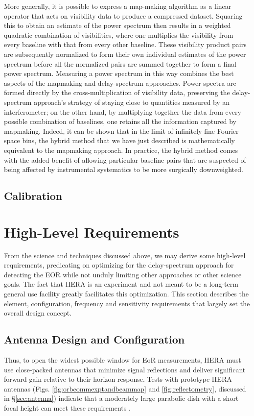 \documentclass[preprint,11pt]{aastex}
\begin{document}
More generally, it is possible to express a map-making algorithm as a linear operator that acts on visibility data to produce a compressed dataset. Squaring this to obtain an estimate of the power spectrum then results in a weighted quadratic combination of visibilities, where one multiplies the visibility from every baseline with that from every other baseline. These visibility product pairs are subsequently normalized to form their own individual estimates of the power spectrum before all the normalized pairs are summed together to form a final power spectrum. Measuring a power spectrum in this way combines the best aspects of the mapmaking and delay-spectrum approaches. Power spectra are formed directly by the cross-multiplication of visibility data, preserving the delay-spectrum approach's strategy of staying close to quantities measured by an interferometer; on the other hand, by multiplying together the data from every possible combination of baselines, one retains all the information captured by mapmaking. Indeed, it can be shown \citep{liu_et_al2014a} that in the limit of infinitely fine Fourier space bins, the hybrid method that we have just described is mathematically equivalent to the mapmaking approach. In practice, the hybrid method comes with the added benefit of allowing particular baseline pairs that are suspected of being affected by instrumental systematics to be more surgically downweighted.

\subsection{Calibration}
\label{sec:calibration}



\section{High-Level Requirements} 
\label{sec:requirements}
From the science and techniques discussed above, we may derive some high-level requirements, predicating on optimizing for the delay-spectrum approach for detecting the EOR while not unduly limiting other approaches or other science goals.  The fact that HERA is an experiment and not meant to be a long-term general use facility greatly facilitates this optimization. This section describes the element, configuration, frequency and sensitivity requirements that largely set the overall design concept.

\subsection{Antenna Design and Configuration}
Thus, to open the widest possible window for EoR measurements, HERA must use close-packed antennas that
minimize signal reflections and deliver significant forward gain relative to their horizon response.
Tests with prototype HERA antennas (Figs. \ref{fig:orbcommexptandbeammap} and \ref{fig:reflectometry}, discussed in \S\ref{sec:antenna})
indicate that a moderately large parabolic dish with a short focal height can meet these requirements
\citep{ewall-wice_et_al2016-EoXLimits,neben_et_al2016,thyagarajan_et_al2016}.
\end{document}
